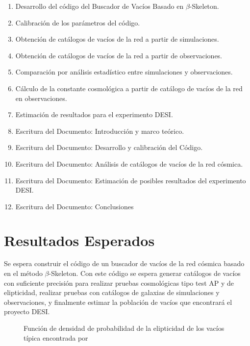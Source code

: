 \documentclass[preprint]{aastex62}
\begin{document}
  
  \begin{enumerate}
  \item Desarrollo del código del Buscador de Vacíos Basado en $\beta$-Skeleton.
  \item Calibración de los parámetros del código.
  \item Obtención de catálogos de vacíos de la red a partir de simulaciones.
  \item Obtención de catálogos de vacíos de la red a partir de observaciones.
  \item Comparación por análisis estadístico entre simulaciones y observaciones.
  \item Cálculo de la constante cosmológica a partir de catálogo de vacíos de la red en
    observaciones.
  \item Estimación de resultados para el experimento DESI.
  \item Escritura del Documento: Introducción y marco teórico.
  \item Escritura del Documento: Desarrollo y calibración del Código.
  \item Escritura del Documento: Análisis de catálogos de vacíos de la red cósmica. 
  \item Escritura del Documento: Estimación de posibles resultados del experimento DESI.
  \item Escritura del Documento: Conclusiones
  \end{enumerate}
  
  
  \section{Resultados Esperados}

  Se espera construir el código de un buscador de vacíos de la red cósmica basado en el
  método $\beta$-Skeleton. Con este código se espera generar catálogos de vacíos con
  suficiente precisión para realizar pruebas cosmológicas tipo test AP y de elipticidad,
  realizar pruebas con catálogos de galaxias de simulaciones y observaciones, y finalmente
  estimar la población de vacíos que encontrará el proyecto DESI.

  \begin{figure}
    \caption{ Función de densidad de probabilidad de la elipticidad de los vacíos típica
      encontrada por \citep{https://arxiv.org/pdf/0906.4101.pdf} \label{fig:expected_results}}
  \end{figure}
\end{document}
